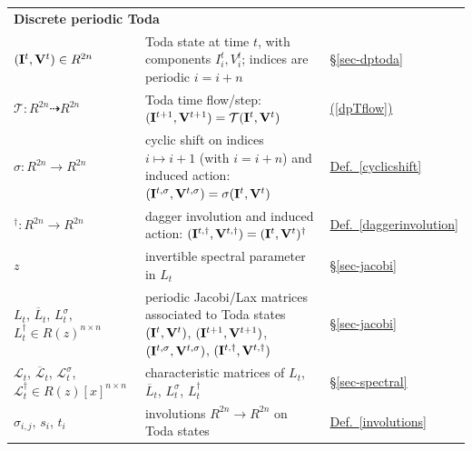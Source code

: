 \documentclass[11pt, a4paper]{amsart}
\theoremstyle{plain}
\numberwithin{equation}{section}
\begin{document}
\begin{table}[H]
\begin{tabular}{p{} p{} p{}}
\multicolumn{3}{l}{\textbf{Discrete periodic Toda}}\\
$(\bold I^t,\bold V^t)\in R^{2n}$ & Toda state at time $t$, with components $I_i^t,V_i^t$; indices are periodic $i = i+n$ & \hyperref[sec-dptoda]{\S\ref*{sec-dptoda}} \\
$\mathcal T : R^{2n}\dashrightarrow R^{2n}$ & Toda time flow/step: $(\bold I^{t+1},\bold V^{t+1}) = \mathcal T(\bold I^t,\bold V^t)$ & \hyperref[dpTflow]{(\ref*{dpTflow})} \\
$\sigma :R^{2n}\to R^{2n}$ & cyclic shift on indices $i\mapsto i+1$ (with $i = i+n$) and induced action: $(\bold I ^{t,\sigma},\bold V ^{t,\sigma}) = \sigma(\bold I ^t,\bold V ^t)$ & \hyperref[cyclicshift]{Def.~\ref*{cyclicshift}} \\
${}^\dagger :R^{2n}\to R^{2n}$ & dagger involution and induced action: $(\bold I ^{t,\dagger},\bold V ^{t,\dagger}) = (\bold I ^t,\bold V ^t)^\dagger$ & \hyperref[daggerinvolution]{Def.~\ref*{daggerinvolution}} \\
$z$ & invertible spectral parameter in $L_t$ & \hyperref[sec-jacobi]{\S\ref*{sec-jacobi}} \\
$L_t$, $\overline L_t$, $L^\sigma_t$, $L^\dagger_t \in R(z)^{n\times n}$ & periodic Jacobi/Lax matrices associated to \hspace{0cm}Toda states $(\bold I^t,\bold V^t)$, $(\bold I^{t+1},\bold V^{t+1})$, $(\bold I ^{t,\sigma},\bold V ^{t,\sigma}) $, $(\bold I^{t,\dagger}, \bold V^{t,\dagger})$ & \hyperref[sec-jacobi]{\S\ref*{sec-jacobi}} \\
$\mathcal L_t$, $\overline {\mathcal L}_t$, $\mathcal L_t^\sigma$, $\mathcal L_t^\dagger \in R(z)[x]^{n\times n }$ & characteristic matrices of $L_t$, $\overline L_t$, $L^\sigma_t$, $L_t^\dagger$ & \hyperref[sec-spectral]{\S\ref*{sec-spectral}} \\
$\sigma_{i,j}$, $s_i$, $t_i$ & involutions $R^{2n}\to R^{2n}$ on Toda states & \hyperref[involutions]{Def.~\ref*{involutions}} \\
\hline


\end{tabular}
\end{table}
\end{document}
